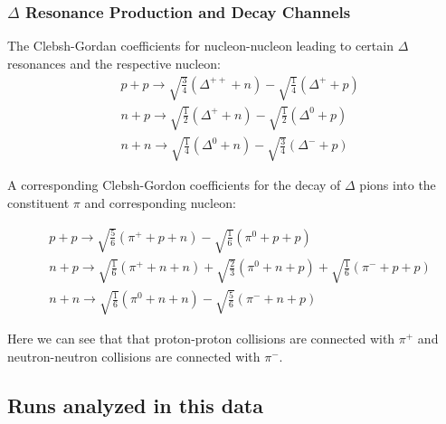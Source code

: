 \renewcommand{\thefigure}{A\arabic{figure}}
\renewcommand{\thetable}{A\arabic{figure}}
\chapter{}

\subsection{$\Delta$ Resonance Production and Decay Channels}
\label{appen:deltadecay}

The Clebsh-Gordan coefficients for nucleon-nucleon leading to certain $\Delta$ resonances and the respective nucleon: 
\begin{equation}
\begin{split}
& p + p \rightarrow \sqrt{\frac{3}{4}}(\Delta^{++} + n) - \sqrt{\frac{1}{4}}(\Delta^{+} + p) \\
& n + p \rightarrow \sqrt{\frac{1}{2}}(\Delta^{+} + n) - \sqrt{\frac{1}{2}}(\Delta^{0} + p)  \\
& n + n \rightarrow \sqrt{\frac{1}{4}}(\Delta^{0} + n) - \sqrt{\frac{3}{4}}(\Delta^{-} + p) 
\end{split}
\label{eq:deltaProduction}
\end{equation}

A corresponding Clebsh-Gordon coefficients for the decay of $\Delta$ pions into the constituent $\pi$ and corresponding nucleon:

\begin{equation}
\begin{split}
& p + p \rightarrow \sqrt{\frac{5}{6}}(\pi^+ + p + n) - \sqrt{\frac{1}{6}}(\pi^0 + p + p) \\
& n + p \rightarrow \sqrt{\frac{1}{6}}(\pi^+ + n + n) + \sqrt{\frac{2}{3}}(\pi^0 + n + p) + \sqrt{\frac{1}{6}}(\pi^- + p + p)  \\
& n + n \rightarrow \sqrt{\frac{1}{6}}(\pi^0 + n + n) - \sqrt{\frac{5}{6}}(\pi^- + n + p) 
\end{split}
\label{eq:pionProduction}
\end{equation}

Here we can see that that proton-proton collisions are connected with $\pi^+$ and neutron-neutron collisions are connected with $\pi^-$. 


\section{Runs analyzed in this data}

